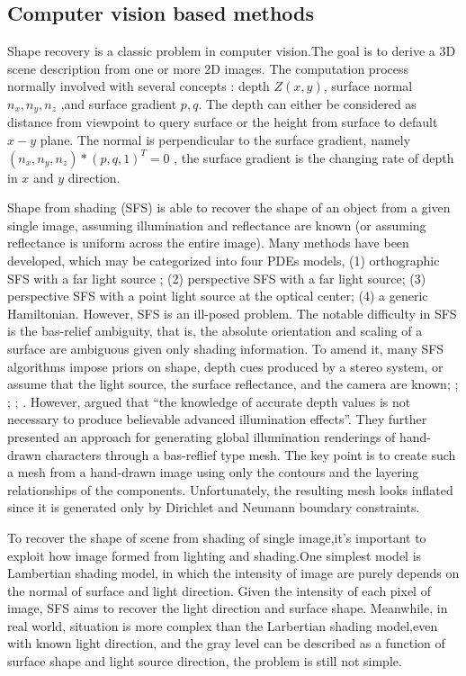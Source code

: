 \subsection{Computer vision based methods}

Shape recovery is a classic problem in computer vision.The goal is to derive a 3D scene description from one or more 2D images. The computation process normally involved with several concepts : depth $Z(x,y)$, surface normal $n_x,n_y,n_z$ ,and surface gradient $p,q$. The depth can either be considered as distance from viewpoint to query surface or the height from surface to default $x-y$ plane. The normal is perpendicular to the surface gradient, namely $\left( n_x,n_y,n_z\right) * \left( p, q ,1\right)^T =0  $ , the surface gradient is the changing rate of depth in $x$ and $y$ direction. 

Shape from shading (SFS) is able to recover the shape of an object from a given single image, assuming illumination and reflectance are known (or assuming reflectance is uniform across the entire image). Many methods have been developed, which may be categorized into four PDEs models\cite{prados2003perspective}, (1) orthographic SFS with a far light source \cite{lions1993shape}; (2) perspective SFS with a far light source\cite{prados2004unifying}; (3) perspective SFS with a point light source at the optical center\cite{prados2003perspective}; (4) a generic Hamiltonian. However, SFS is an ill-posed problem. The notable difficulty in SFS is the bas-relief ambiguity\cite{belhumeur1999bas}, that is, the absolute orientation and scaling of a surface are ambiguous given only shading information. To amend it, many SFS algorithms impose priors on shape, depth cues produced by a stereo system, or assume that the light source, the surface reflectance, and the camera are known\cite{zhang1999shape}; \cite{alldrin2007resolving}; \cite{johnson2011shape}; \cite{barron2012color}; \cite{han2013high}.
However,\cite{sykora2014ink} argued that “the knowledge of accurate depth values is not necessary to produce believable advanced illumination effects”. They further presented an approach for generating global illumination renderings of hand-drawn characters through a bas-reflief type mesh. The key point is to create such a mesh from a hand-drawn image using only the contours and the layering relationships of the components. Unfortunately, the resulting mesh looks inflated since it is generated only by Dirichlet and Neumann boundary constraints.


To recover the shape of scene from shading of single image,it's important to exploit how image formed from lighting and shading.One simplest model is Lambertian shading model, in which the intensity of image are purely depends on the normal of surface and light direction. Given the intensity of each pixel of image, SFS aims to recover the light direction and surface shape. Meanwhile, in real world, situation is more complex than the Larbertian shading model,even with known light direction, and the gray level can be described as a function of surface shape and light source direction, the problem is still not simple. 

